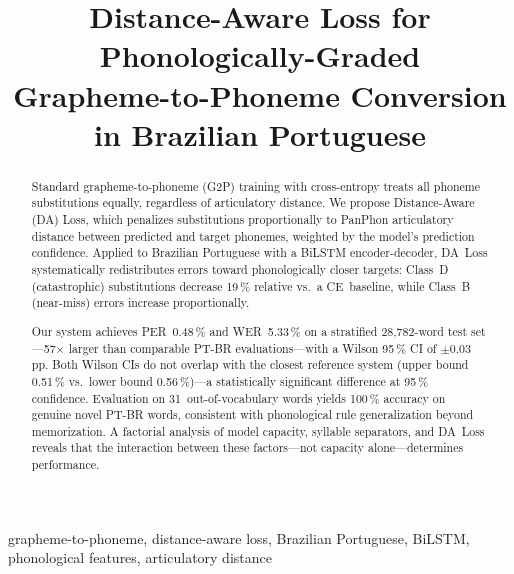 \documentclass[conference]{IEEEtran}
\begin{document}

\title{Distance-Aware Loss for Phonologically-Graded\\
       Grapheme-to-Phoneme Conversion in Brazilian Portuguese}

\author{%
}

\maketitle

\begin{abstract}
Standard grapheme-to-phoneme (G2P) training with cross-entropy
treats all phoneme substitutions equally, regardless of articulatory
distance.
We propose Distance-Aware (DA) Loss, which penalizes substitutions
proportionally to PanPhon articulatory distance between predicted and
target phonemes, weighted by the model's prediction confidence.
Applied to Brazilian Portuguese with a BiLSTM encoder-decoder,
DA~Loss systematically redistributes errors toward phonologically
closer targets: Class~D (catastrophic) substitutions decrease
19\,\% relative vs.\ a CE~baseline, while Class~B (near-miss)
errors increase proportionally.

Our system achieves PER~0.48\,\% and WER~5.33\,\% on a stratified
28{,}782-word test set---57$\times$ larger than comparable PT-BR
evaluations---with a Wilson 95\,\% CI of $\pm$0.03\,pp.
Both Wilson CIs do not overlap with the closest reference system
(upper bound 0.51\,\% vs.\ lower bound 0.56\,\%)---a statistically
significant difference at 95\,\% confidence.
Evaluation on 31~out-of-vocabulary words yields 100\,\% accuracy
on genuine novel PT-BR words, consistent with phonological rule
generalization beyond memorization.
A factorial analysis of model capacity, syllable separators, and
DA~Loss reveals that the interaction between these factors---not
capacity alone---determines performance.
\end{abstract}

\begin{IEEEkeywords}
grapheme-to-phoneme, distance-aware loss, Brazilian Portuguese,
BiLSTM, phonological features, articulatory distance
\end{IEEEkeywords}
\end{document}
